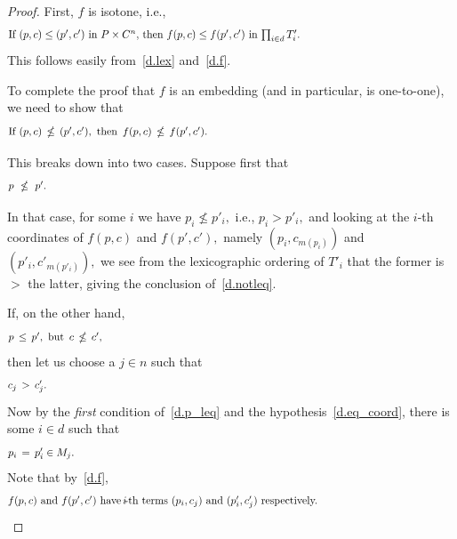 \documentclass{amsart}
\numberwithin{equation}{section}
\numberwithin{theorem}{section}
\newcommand{\2}{\mathbf{2}}
\begin{document}
\begin{proof}
First, $f$ is isotone, i.e.,
%
\begin{equation}\begin{minipage}[c]{35pc}\label{d.f_isotone}
If $(p,c) \leq (p',c')$ in $P\times C^n,$ then
$f(p,c) \leq f(p',c')$ in $\prod_{i\in d} T'_i.$
\end{minipage}\end{equation}
%
This follows easily from~\eqref{d.lex} and~\eqref{d.f}.

To complete the proof that $f$ is an embedding
(and in particular, is one-to-one), we need to show that
%
\begin{equation}\begin{minipage}[c]{35pc}\label{d.notleq}
If $(p,c)\,\nleq\,(p',c'),$ \,then\, $f(p,c)\,\nleq\,f(p',c').$
\end{minipage}\end{equation}

This breaks down into two cases.
Suppose first that
%
\begin{equation}\begin{minipage}[c]{35pc}\label{d.p_notleq}
$p\ \nleq\ p'.$
\end{minipage}\end{equation}

In that case, for some $i$ we have $p_i\nleq p'_i,$
i.e., $p_i> p'_i,$ and
looking at the $\!i\!$-th coordinates of $f(p,c)$ and $f(p',c'),$
namely $(p_i,c_{m(p_i)})$ and $(p'_i,c'_{m(p'_i)}),$
we see from the lexicographic ordering of $T'_i$
that the former is $>$ the latter,
giving the conclusion of~\eqref{d.notleq}.

If, on the other hand,
%
\begin{equation}\begin{minipage}[c]{35pc}\label{d.p_leq}
$p\,\leq\,p',$ \,but\, $c\,\nleq\,c',$
\end{minipage}\end{equation}
%
then let us choose a $j\in n$ such that
%
\begin{equation}\begin{minipage}[c]{35pc}\label{d.c_j_notleq}
$c_j\,>\,c'_j.$
\end{minipage}\end{equation}
%
Now by the {\em first} condition of~\eqref{d.p_leq} and
the hypothesis~\eqref{d.eq_coord}, there is some $i\in d$ such that
%
\begin{equation}\begin{minipage}[c]{35pc}\label{d.use_eq_coord}
$p_i\,=\,p'_i\in M_j.$
\end{minipage}\end{equation}
%
Note that by~\eqref{d.f},
%
\begin{equation}\begin{minipage}[c]{35pc}\label{d.ith_coords}
$f(p,c)$ and $f(p',c')$ have $\!i\!$-th terms
$(p_i,c_j)$ and $(p'_i,c'_j)$ respectively.
\end{minipage}\end{equation}


\end{proof}
\end{document}
